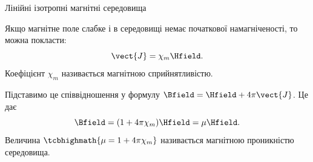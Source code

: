 \documentclass{beamer}
\begin{document}
\begin{frame}{Лінійні ізотропні магнітні середовища}{}
	\begin{block}{}
		Якщо магнітне поле слабке і в середовищі немає початкової намагніченості, то можна покласти:
		\begin{equation*}
			\vect{J} = \chi_m\Hfield.
		\end{equation*}
		Коефіцієнт $ \chi_m$ називається \alert{магнітною сприйнятливістю}.

		Підставимо це співвідношення у формулу $\Bfield = \Hfield + 4\pi\vect{J}$. Це дає
		\begin{equation*}
			\Bfield = (1+4\pi\chi_m)\Hfield = \mu\Hfield.
		\end{equation*}
		Величина $\tcbhighmath{\mu = 1+4\pi\chi_m}$ називається \alert{магнітною проникністю середовища}.
	\end{block}
\end{frame}
\end{document}

